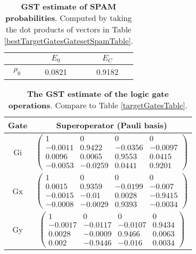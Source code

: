 {\begin{table}[h]
\begin{center}
\begin{tabular}[l]{|c|c|c|}
\hline
 & $E_{0}$ & $E_C$ \\ \hline
$\rho_{0}$ & 0.0821 & 0.9182 \\ \hline
\end{tabular}

\caption{\textbf{GST estimate of SPAM probabilities}.  Computed by taking the dot products of vectors in Table \ref{bestTargetGatesGatesetSpamTable}.\label{bestTargetGatesGatesetSpamParametersTable}}
\end{center}
\end{table}

\begin{table}[h]
\begin{center}
\begin{tabular}[l]{|c|c|}
\hline
Gate & Superoperator (Pauli basis) \\ \hline
Gi & $ \left(\!\!\begin{array}{cccc}
1 & 0 & 0 & 0 \\ 
-0.0011 & 0.9422 & -0.0356 & -0.0097 \\ 
0.0096 & 0.0065 & 0.9553 & 0.0415 \\ 
-0.0053 & -0.0259 & 0.0441 & 0.9201
 \end{array}\!\!\right) $
 \\ \hline
Gx & $ \left(\!\!\begin{array}{cccc}
1 & 0 & 0 & 0 \\ 
0.0015 & 0.9359 & -0.0199 & -0.007 \\ 
-0.0015 & -0.01 & 0.0028 & -0.9415 \\ 
-0.0008 & -0.0029 & 0.9393 & -0.0034
 \end{array}\!\!\right) $
 \\ \hline
Gy & $ \left(\!\!\begin{array}{cccc}
1 & 0 & 0 & 0 \\ 
-0.0017 & -0.0117 & -0.0107 & 0.9434 \\ 
0.0028 & -0.0009 & 0.9466 & 0.0063 \\ 
0.002 & -0.9446 & -0.016 & 0.0034
 \end{array}\!\!\right) $
 \\ \hline
\end{tabular}

\caption{\textbf{The GST estimate of the logic gate operations}.  Compare to Table \ref{targetGatesTable}.\label{bestTargetGatesGatesetGatesTable}}
\end{center}
\end{table}

}

